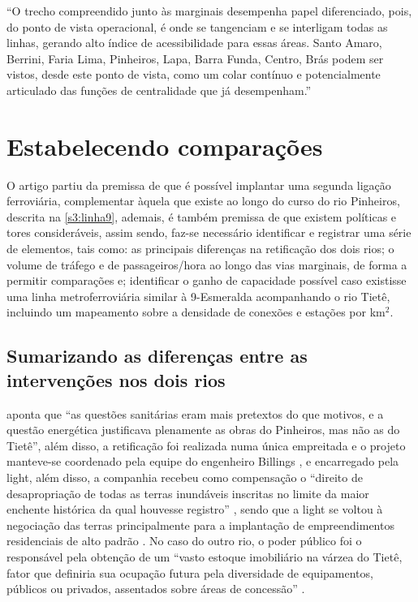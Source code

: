 \documentclass[
article,			%
11pt,				%
oneside,			%
a4paper,			%
english,			%
brazil,				%
sumario=tradicional
]{abntex2}
\begin{document}
	\begin{citacao}
		``O trecho compreendido junto às marginais desempenha papel diferenciado, pois, do ponto de vista operacional, é onde se tangenciam e se interligam todas as linhas, gerando alto índice de acessibilidade para essas áreas. Santo Amaro, Berrini, Faria Lima, Pinheiros, Lapa, Barra Funda, Centro, Brás podem ser vistos, desde este ponto de vista, como um colar contínuo e potencialmente articulado das funções de centralidade que já desempenham.''
	\end{citacao}
	
	
	\section{Estabelecendo comparações} \label{s1:comparando}
	
	O artigo partiu da premissa de que é possível implantar uma segunda ligação ferroviária, complementar àquela que existe ao longo do curso do rio Pinheiros, descrita na \autoref{s3:linha9}, ademais, é também premissa de que existem políticas e tores consideráveis, assim sendo, faz-se necessário identificar e registrar uma série de elementos, tais como: as principais diferenças na retificação dos dois rios; o volume de tráfego e de passageiros/hora ao longo das vias marginais, de forma a permitir comparações e; identificar o ganho de capacidade possível caso existisse uma linha metroferroviária similar à 9-Esmeralda acompanhando o rio Tietê, incluindo um mapeamento sobre a densidade de conexões e estações por km$^{2}$.
	
	\subsection{Sumarizando as diferenças entre as intervenções nos dois rios} \label{s2:sumarizando}
	
	 aponta que ``as questões sanitárias eram mais pretextos do que motivos, e a questão energética justificava plenamente as obras do Pinheiros, mas não as do Tietê'', além disso, a retificação foi realizada numa única empreitada e o projeto manteve-se coordenado pela equipe do engenheiro Billings \cite[p. 58]{franco2005a}, e encarregado pela \glsdesc{light}, além disso, a companhia recebeu como compensação o ``direito de desapropriação de todas as terras inundáveis inscritas no limite da maior enchente histórica da qual houvesse registro'' \cite[p. 59]{franco2005a}, sendo que a \gls{light} se voltou à negociação das terras principalmente para a implantação de empreendimentos residenciais de alto padrão \cite[p. 55]{franco2005a}. No caso do outro rio, o poder público foi o responsável pela obtenção de um ``vasto estoque imobiliário na várzea do Tietê, fator que definiria sua ocupação futura pela diversidade de equipamentos, públicos ou privados, assentados sobre áreas de concessão'' \cite[p. 55]{franco2005a}.
	
\end{document}
